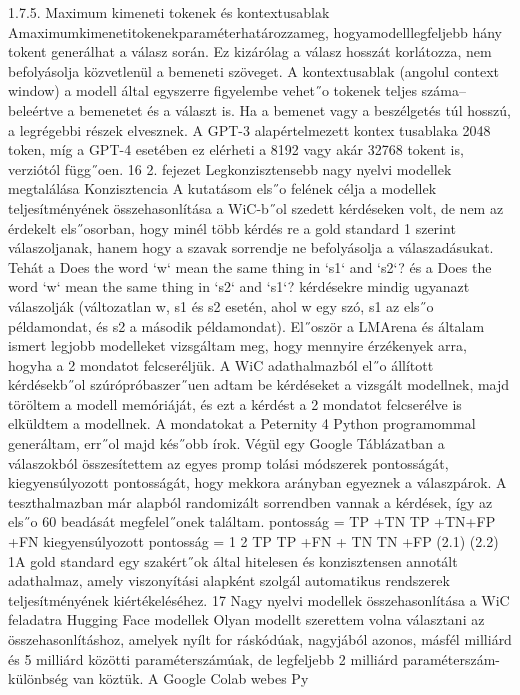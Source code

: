 \documentclass[12pt]{report}
\theoremstyle{definition}
\begin{document}
 1.7.5. Maximum kimeneti tokenek és kontextusablak
 Amaximumkimenetitokenekparaméterhatározzameg, hogyamodelllegfeljebb
 hány tokent generálhat a válasz során. Ez kizárólag a válasz hosszát korlátozza, nem
 befolyásolja közvetlenül a bemeneti szöveget.
 A kontextusablak (angolul context window) a modell által egyszerre figyelembe
 vehet˝o tokenek teljes száma– beleértve a bemenetet és a választ is. Ha a bemenet vagy a
 beszélgetés túl hosszú, a legrégebbi részek elvesznek. A GPT-3 alapértelmezett kontex
tusablaka 2048 token, míg a GPT-4 esetében ez elérheti a 8192 vagy akár 32768 tokent
 is, verziótól függ˝oen.
 16
2. fejezet
 Legkonzisztensebb nagy nyelvi
 modellek megtalálása
 Konzisztencia
 A kutatásom els˝o felének célja a modellek teljesítményének összehasonlítása a
 WiC-b˝ol szedett kérdéseken volt, de nem az érdekelt els˝osorban, hogy minél több kérdés
re a gold standard 1 szerint válaszoljanak, hanem hogy a szavak sorrendje ne befolyásolja
 a válaszadásukat. Tehát a
 Does the word ‘w‘ mean the same thing in ‘s1‘ and ‘s2‘?
 és a
 Does the word ‘w‘ mean the same thing in ‘s2‘ and ‘s1‘?
 kérdésekre mindig ugyanazt válaszolják (változatlan w, s1 és s2 esetén, ahol w egy
 szó, s1 az els˝o példamondat, és s2 a második példamondat).
 El˝oször a LMArena és általam ismert legjobb modelleket vizsgáltam meg, hogy
 mennyire érzékenyek arra, hogyha a 2 mondatot felcseréljük. A WiC adathalmazból el˝o
állított kérdésekb˝ol szúrópróbaszer˝uen adtam be kérdéseket a vizsgált modellnek, majd
 töröltem a modell memóriáját, és ezt a kérdést a 2 mondatot felcserélve is elküldtem a
 modellnek. A mondatokat a Peternity 4 Python programommal generáltam, err˝ol majd
 kés˝obb írok. Végül egy Google Táblázatban a válaszokból összesítettem az egyes promp
tolási módszerek pontosságát, kiegyensúlyozott pontosságát, hogy mekkora arányban
 egyeznek a válaszpárok. A teszthalmazban már alapból randomizált sorrendben vannak a
 kérdések, így az els˝o 60 beadását megfelel˝onek találtam.
 pontosság =
 TP +TN
 TP +TN+FP +FN
 kiegyensúlyozott pontosság = 1
 2
TP
 TP +FN + TN
 TN +FP
 (2.1)
 (2.2)
 1A gold standard egy szakért˝ok által hitelesen és konzisztensen annotált adathalmaz, amely viszonyítási
 alapként szolgál automatikus rendszerek teljesítményének kiértékeléséhez.
 17
Nagy nyelvi modellek összehasonlítása a WiC feladatra
 Hugging Face modellek
 Olyan modellt szerettem volna választani az összehasonlításhoz, amelyek nyílt for
ráskódúak, nagyjából azonos, másfél milliárd és 5 milliárd közötti paraméterszámúak, de
 legfeljebb 2 milliárd paraméterszám-különbség van köztük. A Google Colab webes Py
\end{document}
